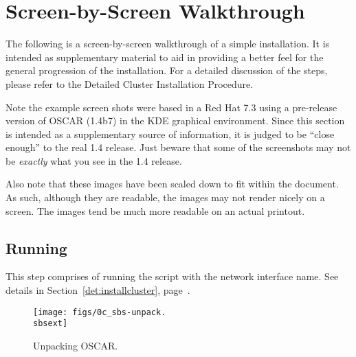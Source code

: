 %
%
%

\newpage

\section{Screen-by-Screen Walkthrough}
\label{app:screen-by-screen}

The following is a screen-by-screen walkthrough of a simple installation.
It is intended as supplementary material to aid in providing a better feel
for the general progression of the installation.  For a detailed discussion
of the steps, please refer to the Detailed Cluster Installation Procedure. 

Note the example screen shots were based in a Red Hat 7.3 using a
pre-release version of OSCAR (1.4b7) in the KDE graphical environment.
Since this section is intended as a supplementary source of
information, it is judged to be ``close enough'' to the real 1.4
release.  Just beware that some of the screenshots may not be {\em
  exactly} what you see in the 1.4 release.

Also note that these images have been scaled down to fit within the
document.  As such, although they are readable, the images may not
render nicely on a screen.  The images tend be much more readable on
an actual printout.



\subsection{Running }

This step comprises of running the  script with
the network interface name.  See details in
Section~\ref{det:installcluster}, page~\pageref{det:installcluster}.


\begin{figure}[h!]
  \begin{center}
    \centerline{\texttt{[image: figs/0c\_sbs-unpack.\\sbsext]}}
    \caption{Unpacking OSCAR.}
    \label{fig:sbs-unpacking-oscar}
  \end{center}
\end{figure}

